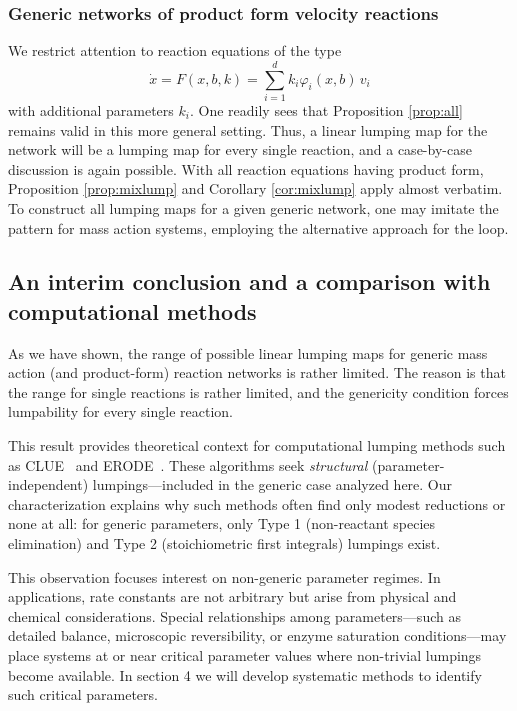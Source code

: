 \documentclass{article}
\begin{document}
\subsubsection{Generic networks of product form velocity reactions}
We restrict attention to reaction equations of the type
\[
\dot x=F(x,b,k)=\sum_{i=1}^d k_i \varphi_i(x,b)\,v_i
\]
with additional parameters $k_i$. One readily sees that Proposition \ref{prop:all} remains valid in this more general setting. Thus, a linear lumping map for the network will be a lumping map for every single reaction, and a case-by-case discussion is again possible. With all reaction equations having product form, Proposition \ref{prop:mixlump} and Corollary \ref{cor:mixlump} apply almost verbatim. \\

To construct all lumping maps for a given generic network, one may imitate the pattern for mass action systems, employing the alternative approach for the loop.


\subsection{An interim conclusion and a comparison with computational methods}
As we have shown, the range of possible linear lumping maps for generic mass action (and 
product-form) reaction networks is rather limited. The reason is that the range for single 
reactions is rather limited, and the genericity condition forces lumpability for every single reaction.


This result provides theoretical context for computational lumping methods such as 
CLUE~\cite{OVPT2021} and ERODE~\cite{CardelliTTV2017}. These algorithms seek \emph{structural} 
(parameter-independent) lumpings---included in the generic case analyzed here. Our characterization explains why such methods often find only modest reductions or none at all: for generic 
parameters, only Type 1 (non-reactant species elimination) and Type 2 (stoichiometric first 
integrals) lumpings exist.


This observation focuses interest on non-generic parameter regimes. In applications, rate 
constants are not arbitrary but arise from physical and chemical considerations. Special 
relationships among parameters---such as detailed balance, microscopic reversibility, or 
enzyme saturation conditions---may place systems at or near critical parameter values where 
non-trivial lumpings become available. In section 4 we will develop systematic methods to identify 
such critical parameters.
\end{document}
